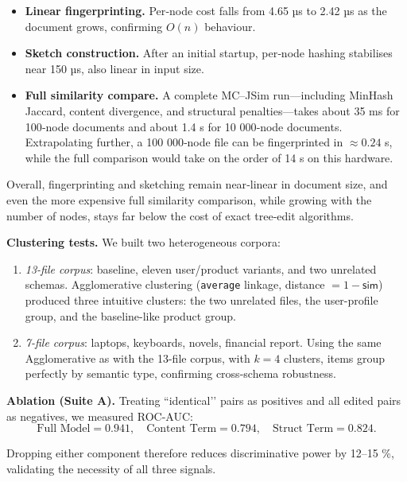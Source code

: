 \documentclass[sigconf]{acmart}
\begin{document}
\begin{itemize}
  \item \textbf{Linear fingerprinting.}  
        Per‐node cost falls from 4.65 µs to 2.42 µs as the document grows, confirming \(O(n)\) behaviour.
  \item \textbf{Sketch construction.}  
        After an initial startup, per‐node hashing stabilises near 150 µs, also linear in input size.
  \item \textbf{Full similarity compare.}  
        A complete MC–JSim run—including MinHash Jaccard, content divergence, and structural penalties—takes about 35 ms for 100‐node documents and about 1.4 s for 10 000‐node documents.  Extrapolating further, a 100 000‐node file can be fingerprinted in \(\approx0.24\) s, while the full comparison would take on the order of 14 s on this hardware.
\end{itemize}

Overall, fingerprinting and sketching remain near‐linear in document size, and even the more expensive full similarity comparison, while growing with the number of nodes, stays far below the cost of exact tree‐edit algorithms.  

\bigskip
\noindent\textbf{Clustering tests.}
We built two heterogeneous corpora:

\begin{enumerate}
\item \emph{13-file corpus}: baseline, eleven user/product variants, and
      two unrelated schemas.  Agglomerative clustering
      (\texttt{average} linkage, distance \(=1-\mathsf{sim}\))
      produced three intuitive clusters:  
      the two unrelated files, the user-profile group, and the
      baseline-like product group.
\item \emph{7-file corpus}: laptops, keyboards, novels, financial report.
      Using the same Agglomerative as with the 13-file corpus, with \(k=4\) clusters, items group perfectly by semantic type,
      confirming cross-schema robustness.
\end{enumerate}

\bigskip
\noindent\textbf{Ablation (Suite A).}
Treating “identical’’ pairs as positives and all edited pairs as
negatives, we measured ROC-AUC:
\[
\text{Full Model}=0.941,\quad
\text{Content Term}=0.794,\quad
\text{Struct Term}=0.824.
\]

Dropping either component therefore reduces discriminative power by
12–15 \%, validating the necessity of all three signals.
\end{document}
